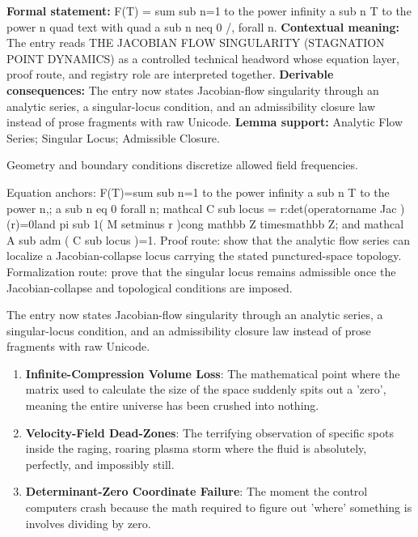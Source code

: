 \begingroup\footnotesize\setlength{\emergencystretch}{3em}\sloppy
\textbf{Formal statement:} F(T) = sum sub n=1 to the power infinity a sub n T to the power n quad text with quad a sub n neq 0 /, forall n. \textbf{Contextual meaning:} The entry reads THE JACOBIAN FLOW SINGULARITY (STAGNATION POINT DYNAMICS) as a controlled technical headword whose equation layer, proof route, and registry role are interpreted together. \textbf{Derivable consequences:} The entry now states Jacobian-flow singularity through an analytic series, a singular-locus condition, and an admissibility closure law instead of prose fragments with raw Unicode. \textbf{Lemma support:} Analytic Flow Series; Singular Locus; Admissible Closure.\par
\endgroup

Geometry and boundary conditions discretize allowed field frequencies.

Equation anchors: F(T)=sum sub n=1 to the power infinity a sub n T to the power n,; a sub n eq 0 forall n; mathcal C sub locus = r:det(operatorname Jac )(r)=0land pi sub 1( M setminus r )cong mathbb Z timesmathbb Z; and mathcal A sub adm ( C sub locus )=1. Proof route: show that the analytic flow series can localize a Jacobian-collapse locus carrying the stated punctured-space topology. Formalization route: prove that the singular locus remains admissible once the Jacobian-collapse and topological conditions are imposed.

The entry now states Jacobian-flow singularity through an analytic series, a singular-locus condition, and an admissibility closure law instead of prose fragments with raw Unicode.
\endgroup

\begin{enumerate}[leftmargin=1.6em,itemsep=6pt,topsep=4pt]
\item \textbf{Infinite-Compression Volume Loss}: The mathematical point where the matrix used to calculate the size of the space suddenly spits out a 'zero', meaning the entire universe has been crushed into nothing.
\item \textbf{Velocity-Field Dead-Zones}: The terrifying observation of specific spots inside the raging, roaring plasma storm where the fluid is absolutely, perfectly, and impossibly still.
\item \textbf{Determinant-Zero Coordinate Failure}: The moment the control computers crash because the math required to figure out 'where' something is involves dividing by zero.
\end{enumerate}


